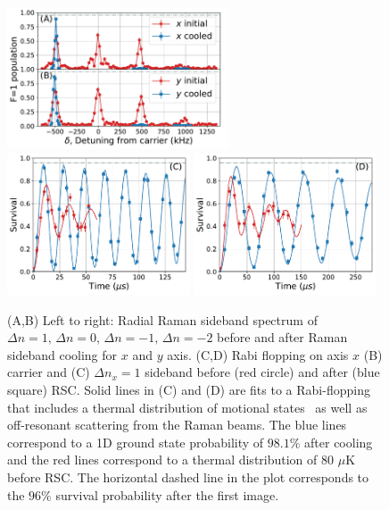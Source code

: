 \documentclass[aps,prl,twocolumn,groupedaddress]{revtex4-1}
\begin{document}
\begin{figure}
  \includegraphics[height=4.2cm]{spectrum_r.pdf}
  \includegraphics[height=4.2cm]{rabi_flop_rx_0.pdf}
  \includegraphics[height=4.2cm]{rabi_flop_rx_p1.pdf}
  \caption{(A,B) Left to right: Radial Raman sideband spectrum of $\Delta n=1,\,\Delta n=0,\,\Delta n=-1,\,\Delta n=-2$ before and after Raman sideband cooling for $x$ and $y$ axis.
    (C,D) Rabi flopping on axis $x$ (B) carrier and (C) $\Delta n_x=1$ sideband
    before (red circle) and after (blue square) RSC.
    Solid lines in (C) and (D) are fits to a Rabi-flopping
    that includes a thermal distribution of motional states~\cite{Meekhof1996}
    as well as off-resonant scattering from the Raman beams.
    The blue lines correspond to a 1D ground state probability of $98.1$\% after cooling
    and the red lines correspond to a thermal distribution of $80$ $\mu$K before RSC.
    The horizontal dashed line in the plot corresponds to the $96\%$ survival probability
    after the first image.
    \label{f-radial}}
\end{figure}
\end{document}
